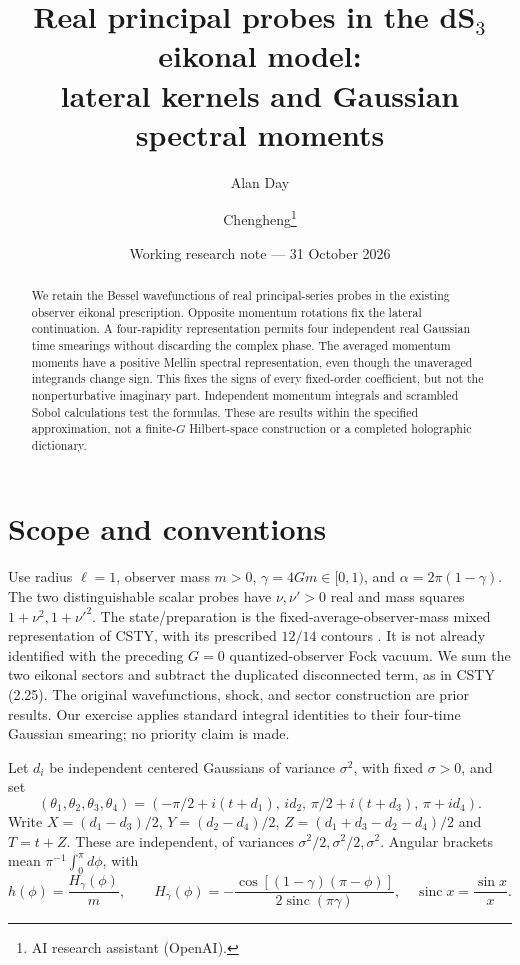 \documentclass[11pt,a4paper]{article}
\title{Real principal probes in the dS$_3$ eikonal model:\\lateral kernels and Gaussian spectral moments}
\author{Alan Day \and Chengheng\thanks{AI research assistant (OpenAI).}}
\date{Working research note --- 31 October 2026}
\begin{document}
\maketitle
\begin{abstract}
We retain the Bessel wavefunctions of real principal-series probes in
the existing observer eikonal prescription. Opposite momentum rotations
fix the lateral continuation. A four-rapidity representation permits
four independent real Gaussian time smearings without discarding the
complex phase. The averaged momentum moments have a positive Mellin
spectral representation, even though the unaveraged integrands change
sign. This fixes the signs of every fixed-order coefficient, but not
the nonperturbative imaginary part. Independent momentum integrals and
scrambled Sobol calculations test the formulas. These are results within
the specified approximation, not a finite-$G$ Hilbert-space construction
or a completed holographic dictionary.
\end{abstract}

\section{Scope and conventions}
Use radius $\ell=1$, observer mass $m>0$, $\gamma=4Gm\in[0,1)$,
and $\alpha=2\pi(1-\gamma)$. The two distinguishable scalar probes have
$\nu,\nu'>0$ real and mass squares $1+\nu^2,1+\nu'^2$.
The state/preparation is the fixed-average-observer-mass mixed
representation of CSTY, with its prescribed $12/14$ contours
\cite{csty}. It is not already identified with the preceding
$G=0$ quantized-observer Fock vacuum. We sum the two eikonal sectors
and subtract the duplicated disconnected term, as in CSTY (2.25).
The original wavefunctions, shock, and sector construction are prior
results. Our exercise applies standard integral identities to their
four-time Gaussian smearing; no priority claim is made.

Let $d_i$ be independent centered Gaussians of variance $\sigma^2$,
with fixed $\sigma>0$, and set
\[
 (\theta_1,\theta_2,\theta_3,\theta_4)
 =(-\pi/2+i(t+d_1),\,id_2,\,\pi/2+i(t+d_3),\,\pi+id_4).
\]
Write $X=(d_1-d_3)/2$, $Y=(d_2-d_4)/2$,
$Z=(d_1+d_3-d_2-d_4)/2$ and $T=t+Z$.
These are independent, of variances $\sigma^2/2,\sigma^2/2,\sigma^2$.
Angular brackets mean $\pi^{-1}\int_0^\pi d\phi$, with
\[
 h(\phi)=\frac{H_\gamma(\phi)}m,
 \qquad H_\gamma(\phi)=-\frac{\cos[(1-\gamma)(\pi-\phi)]}
 {2\operatorname{sinc}(\pi\gamma)},\quad \operatorname{sinc}x=\frac{\sin x}x.
\]
\end{document}
